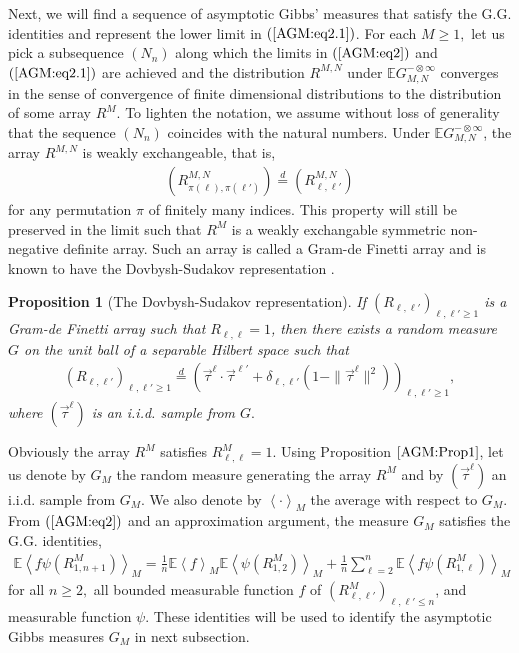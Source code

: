 \documentclass[12pt]{article}
\newcommand{\vtau}{\vec{\tau}}
\newtheorem{proposition}{\bf Proposition}
\newenvironment{Proof of lemma}{\noindent{\bf Proof of Lemma}}{\hfill$\Box$\newline}
\newenvironment{Proof of theorem}{\noindent{\bf Proof of Theorem}}{\hfill{\footnotesize${\square}$}\newline}
\newenvironment{Proof of theorems}{\noindent{\bf Proof of Theorems}}{\hfill$\Box$\newline}
\newenvironment{Proof of proposition}{\noindent{\bf Proof of Proposition}}{\hfill$\Box$\newline}
\newenvironment{Proof of propositions}{\noindent{\bf Proof of Propositions}}{\hfill$\Box$\newline}
\newenvironment{Proof of exercise}{\noindent{\it Proof of Exercise:}}{\hfill$\Box$}
\numberwithin{equation}{section}
\begin{document}
\smallskip

 Next, we will find a sequence of asymptotic Gibbs' measures that satisfy the G.G. identities and represent the lower limit in $(\ref{AGM:eq2.1})$. For each $M\geq 1,$ let us pick a subsequence $(N_n)$ along which the limits in $(\ref{AGM:eq2})$ and $(\ref{AGM:eq2.1})$ are achieved and the distribution $R^{M,N}$ under $\mathbb{E}G_{M,N}^{-\otimes\infty}$ converges in the sense of convergence of finite dimensional distributions to the distribution of some array $R^M$. To lighten the notation, we assume without loss of generality that the sequence $(N_n)$ coincides with the natural numbers. Under $\mathbb{E}G_{M,N}^{-\otimes\infty}$, the array ${R}^{M,N}$ is weakly exchangeable, that is, 
\begin{align*}
\left(R_{\pi(\ell),\pi(\ell')}^{M,N}\right)\stackrel{d}{=}\left(R_{\ell,\ell'}^{M,N}\right)
\end{align*}
for any permutation $\pi$ of finitely many indices. This property will still be preserved in the limit such that $R^M$ is a weakly exchangable symmetric non-negative definite array. Such an array is called a Gram-de Finetti array and is known to have the Dovbysh-Sudakov representation \cite{DS82}.

\begin{proposition}[The Dovbysh-Sudakov representation]\label{AGM:Prop1}
If $(R_{\ell,\ell'})_{\ell,\ell'\geq 1}$ is a Gram-de Finetti array such that $R_{\ell,\ell}=1$, then there exists a random measure $G$ on the unit ball of a separable Hilbert space such that
\begin{align*}
\left(R_{\ell,\ell'}\right)_{\ell,\ell'\geq 1}\stackrel{d}{=}\left(\vtau^{\ell}\cdot\vtau^{\ell'}+\delta_{\ell,\ell'}(1-\|\vtau^{\ell}\|^2)\right)_{\ell,\ell'\geq 1},
\end{align*}
where $(\vtau^\ell)$ is an i.i.d. sample from $G.$
\end{proposition}

\smallskip

\noindent Obviously the array $R^M$ satisfies $R_{\ell,\ell}^M=1.$ Using Proposition $\ref{AGM:Prop1}$, let us denote by $G_M$ the random measure generating the array $R^{M}$ and by $(\vtau^\ell)$ an i.i.d. sample from $G_M$. We also denote by $\left<\cdot\right>_M$ the average with respect to $G_M.$ From $(\ref{AGM:eq2})$ and an approximation argument, the measure $G_M$ satisfies the G.G. identities,
\begin{align}\label{AGM:eq4}
\mathbb{E}\left<f\psi(R_{1,n+1}^M)\right>_M=\frac{1}{n}\mathbb{E}\left<f\right>_M\mathbb{E}\left<\psi(R_{1,2}^M)\right>_M+\frac{1}{n}\sum_{\ell=2}^n
\mathbb{E}\left<f\psi(R_{1,\ell}^M)\right>_M
\end{align}
for all $n\geq 2,$ all bounded measurable function $f$ of $(R_{\ell,\ell'}^M)_{\ell,\ell'\leq n}$, and measurable function $\psi.$
These identities will be used to identify the asymptotic Gibbs measures $G_M$ in next subsection.
\end{document}
